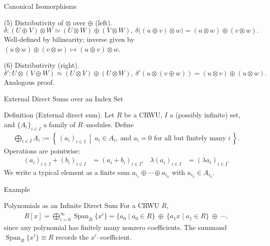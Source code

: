 \begin{frame}{Canonical Isomorphisms}
\begin{block}{(5) Distributivity of $\otimes$ over $\oplus$ (left).}
\[
\delta:(U\oplus V)\otimes W \simeq (U\otimes W)\oplus (V\otimes W),\
\delta\big((u\oplus v)\otimes w\big)=(u\otimes w)\oplus (v\otimes w).
\]
Well-defined by bilinearity; inverse given by $(u\otimes w)\oplus (v\otimes w)\mapsto (u\oplus v)\otimes w$.
\end{block}

\begin{block}{(6) Distributivity (right).}
\[
\delta': U\otimes (V\oplus W) \simeq (U\otimes V)\oplus (U\otimes W),\
\delta'(u\otimes (v\oplus w))=(u\otimes v)\oplus (u\otimes w).
\]
Analogous proof.
\end{block}
\end{frame}






\begin{frame}{External Direct Sums over an Index Set}
\begin{block}{Definition (External direct sum).}
Let $R$ be a CRWU, $I$ a (possibly infinite) set, and $\{A_i\}_{i\in I}$ a family of $R$–modules.
Define
\begin{align*}
\bigoplus_{i\in I} A_i
:= \left\{\, (a_i)_{i\in I} \ \middle|\ a_i\in A_i,\ \text{and } a_i=0 \text{ for all but finitely many } i \,\right\}.
\end{align*}
Operations are pointwise:
\begin{align*}
(a_i)_{i\in I} + (b_i)_{i\in I} &= (a_i+b_i)_{i\in I},
& \lambda (a_i)_{i\in I} &= (\lambda a_i)_{i\in I}.
\end{align*}
We write a typical element as a finite sum $a_{i_1}\oplus \cdots \oplus a_{i_n}$ with $a_{i_k}\in A_{i_k}$.

\end{block}
\end{frame}

\begin{frame}{Example}
\begin{block}{Polynomials as an Infinite Direct Sum}
    For a CRWU $R$,
\begin{align*}
R[x]
= \bigoplus_{i=0}^\infty \operatorname{Span}_R\{x^i\}
= \{a_0\mid a_0\in R\}\ \oplus\ \{a_1x\mid a_1\in R\}\ \oplus\ \cdots ,
\end{align*}
since any polynomial has finitely many nonzero coefficients. The summand $\operatorname{Span}_R\{x^i\}\cong R$ records the $x^i$–coefficient.
\end{block}
\end{frame}

